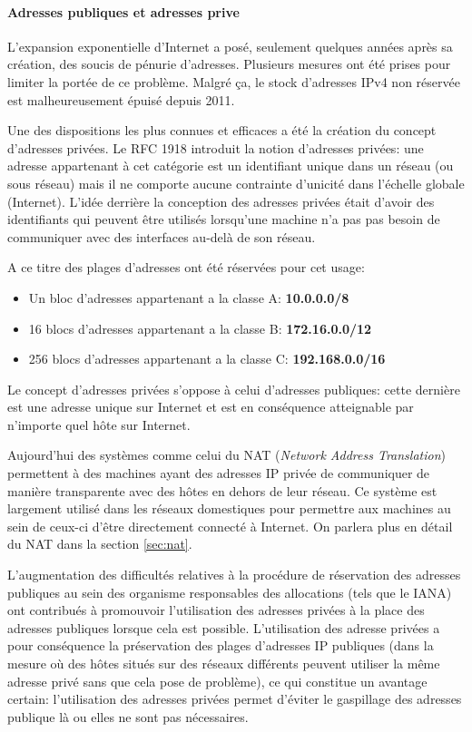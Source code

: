 \paragraph{Adresses publiques et adresses prive}
L'expansion exponentielle d'Internet a posé, seulement quelques années après sa
création, des soucis de pénurie d'adresses. Plusieurs mesures ont été prises
pour limiter la portée de ce problème. Malgré ça, le stock d'adresses IPv4 non
réservée est malheureusement épuisé depuis 2011.

\smallbreak
Une des dispositions les plus connues et efficaces a été la création du concept
d'adresses privées. Le RFC 1918\cite{url-RFC-1918} introduit la notion d'adresses privées: une adresse
appartenant à cet catégorie est un identifiant unique dans un réseau (ou sous
réseau) mais il ne comporte aucune contrainte d'unicité dans l'échelle globale
(Internet). L'idée derrière la conception des adresses privées était 
d'avoir des identifiants qui peuvent être utilisés lorsqu'une machine n'a pas
pas besoin de communiquer avec des interfaces au-delà de son réseau.

A ce titre des plages d'adresses ont été réservées pour cet usage:

\begin{itemize}
\item Un bloc d'adresses appartenant a la classe A: \textbf{10.0.0.0/8}
\item 16 blocs d'adresses appartenant a la classe B: \textbf{172.16.0.0/12}
\item 256 blocs d'adresses appartenant a la classe C: \textbf{192.168.0.0/16}
\end{itemize}

\smallbreak
Le concept d'adresses privées s'oppose à celui d'adresses publiques: cette dernière est 
une adresse unique sur Internet et est en conséquence atteignable par n'importe
quel hôte sur Internet.

Aujourd'hui des systèmes comme celui du NAT ({\it Network Address
Translation}) permettent à des machines ayant des adresses IP privée de communiquer
de manière transparente avec des hôtes en dehors de leur réseau. Ce système est
largement utilisé dans les réseaux domestiques pour permettre aux machines au
sein de ceux-ci d'être directement connecté à Internet. On parlera plus en
détail du NAT dans la section \ref{sec:nat}.
\smallbreak

 
L'augmentation des difficultés relatives à la procédure de réservation des
adresses publiques au sein des organisme responsables des
allocations\cite{url-RFC-1918} (tels que le IANA) ont contribués à promouvoir
l'utilisation des adresses privées à la place des adresses publiques lorsque
cela est possible.  L'utilisation des adresse privées a pour conséquence la
préservation des plages d'adresses IP publiques (dans la mesure où des hôtes
situés sur des réseaux différents peuvent utiliser la même adresse privé sans
que cela pose de problème), ce qui constitue un avantage certain: l'utilisation
des adresses privées permet d'éviter le gaspillage des adresses publique là ou
elles ne sont pas nécessaires.


